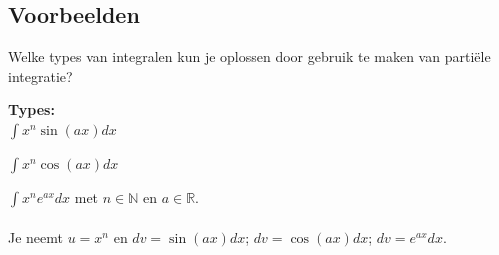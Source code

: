 \subsection{Voorbeelden}

Welke types van integralen kun je oplossen door gebruik te maken van parti\"ele integratie?


\begin{ftrekenregel}
	\textbf{Types:} \\

$\int x^n \sin(ax)dx$

$\int x^n \cos (ax)dx$ 

$\int x^n e^{ax}dx$ met $n \in \mathbb{N}$ en $a \in \mathbb{R}$.
\\
\\
Je neemt $u=x^n$ en $dv=\sin (ax)dx$; $dv=\cos (ax)dx$; $dv=e^{ax}dx$.\\

\end{ftrekenregel}

